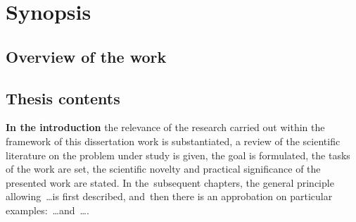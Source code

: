 \chapter*{Synopsis}                      

\section*{Overview of the work}

\newcommand{\actualityEn}{{\textbf\actualityTXTEn}}
\newcommand{\progressEn}{{\textbf\progressTXTEn}}
\newcommand{\aimEn}{{\textbf\aimTXTEn}}
\newcommand{\tasksEn}{\textbf{\tasksTXTEn}}
\newcommand{\noveltyEn}{\textbf{\noveltyTXTEn}}
\newcommand{\influenceEn}{\textbf{\influenceTXTEn}}
\newcommand{\methodsEn}{\textbf{\methodsTXTEn}}
\newcommand{\defpositionsEn}{\textbf{\defpositionsTXTEn}}
\newcommand{\reliabilityEn}{\textbf{\reliabilityTXTEn}}
\newcommand{\probationEn}{\textbf{\probationTXTEn}}
\newcommand{\contributionEn}{\textbf{\contributionTXTEn}}
\newcommand{\publicationsEn}{\textbf{\publicationsTXTEn}}
\newcommand{\implementationEn}{\textbf{\implementationTXTEn}}





\section*{Thesis contents}
\textbf{In the introduction} the relevance of the research carried out within the framework of this dissertation work is substantiated, a review of the scientific literature on the problem under study is given, the goal is formulated, the tasks of the work are set, the scientific novelty and practical significance of the presented work are stated. In the~subsequent chapters, the general principle allowing~\dots is first described, and~then there is an approbation on particular examples:~\dots and~\dots.


